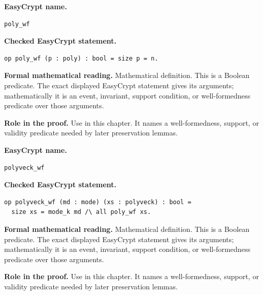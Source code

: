 \begin{formaldefinition}
\noindent\textbf{EasyCrypt name.}
\begin{lstlisting}[language=EasyCrypt,basicstyle=\ttfamily\scriptsize]
poly_wf
\end{lstlisting}
\noindent\textbf{Checked EasyCrypt statement.}
\begin{lstlisting}[language=EasyCrypt,basicstyle=\ttfamily\scriptsize]
op poly_wf (p : poly) : bool = size p = n.
\end{lstlisting}
\noindent\textbf{Formal mathematical reading.}
Mathematical definition. This is a Boolean predicate.  The exact displayed EasyCrypt statement gives its arguments; mathematically it is an event, invariant, support condition, or well-formedness predicate over those arguments.

\noindent\textbf{Role in the proof.}
Use in this chapter. It names a well-formedness, support, or validity predicate needed by later preservation lemmas.

\end{formaldefinition}

\begin{formaldefinition}
\noindent\textbf{EasyCrypt name.}
\begin{lstlisting}[language=EasyCrypt,basicstyle=\ttfamily\scriptsize]
polyveck_wf
\end{lstlisting}
\noindent\textbf{Checked EasyCrypt statement.}
\begin{lstlisting}[language=EasyCrypt,basicstyle=\ttfamily\scriptsize]
op polyveck_wf (md : mode) (xs : polyveck) : bool =
  size xs = mode_k md /\ all poly_wf xs.
\end{lstlisting}
\noindent\textbf{Formal mathematical reading.}
Mathematical definition. This is a Boolean predicate.  The exact displayed EasyCrypt statement gives its arguments; mathematically it is an event, invariant, support condition, or well-formedness predicate over those arguments.

\noindent\textbf{Role in the proof.}
Use in this chapter. It names a well-formedness, support, or validity predicate needed by later preservation lemmas.

\end{formaldefinition}

